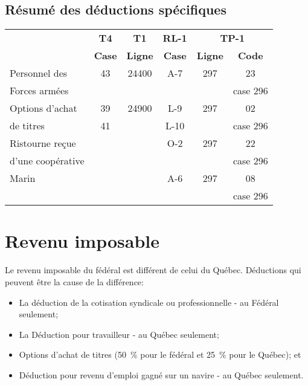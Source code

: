 \subsection{Résumé des déductions spécifiques}
\begin{center}
	\begin{tabular}{|l|c|c|c|c|c|}
		\hline
		&  \textbf{T4}  &  \textbf{T1}   & \textbf{RL-1} & \multicolumn{2}{c|}{\textbf{TP-1}} \\ \cline{5-6}
		& \textbf{Case} & \textbf{Ligne} & \textbf{Case} & \textbf{Ligne} &   \textbf{Code}   \\ \hline
		Personnel des     &      43       &     24400      &      A-7      &      297       &        23         \\
		Forces armées     &               &                &               &                &     case 296      \\ \hline
		Options d'achat   &      39       &     24900      &      L-9      &      297       &        02         \\
		de titres         &      41       &                &     L-10      &                &     case 296      \\ \hline
		Ristourne reçue   &               &                &      O-2      &      297       &        22         \\
		d'une coopérative &               &                &               &                &     case 296      \\ \hline
		Marin             &               &                &      A-6      &      297       &        08         \\
		&               &                &               &                &     case 296      \\ \hline
	\end{tabular}
\end{center}




\section{Revenu imposable}
Le revenu imposable du fédéral est différent de celui du Québec. Déductions qui peuvent être la cause de la différence:

\begin{itemize}
	\item La déduction de la cotisation syndicale ou professionnelle - au Fédéral seulement;
	\item La \og Déduction pour travailleur \fg{} - au Québec seulement;
	\item Options d'achat de titres (50~\% pour le fédéral et 25~\% pour le Québec); et
	\item Déduction pour revenu d'emploi gagné sur un navire - au Québec seulement.
\end{itemize}



